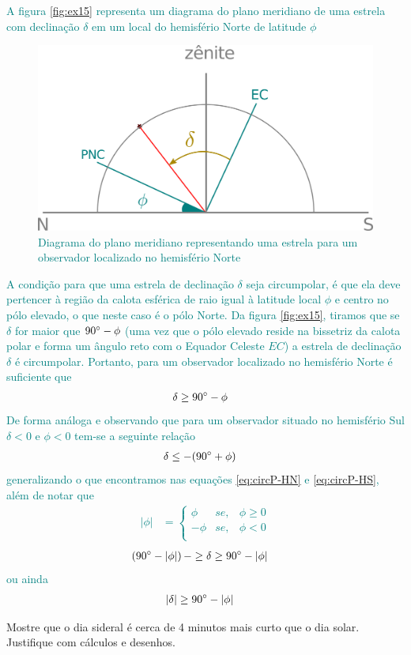 \begin{sol}
	\textcolor{teal} {
		A figura \eqref{fig:ex15} representa um diagrama do plano meridiano de uma estrela com declinação $\delta$ em um local do hemisfério Norte de latitude $\phi$ 
		\begin{figure}[!ht]			
			\centering
			\includegraphics[width=0.5\linewidth]{fig/fig-q15.png}			
			\caption{Diagrama do plano meridiano representando uma estrela para um observador localizado no hemisfério Norte}
			\label{fig:ex15}
		\end{figure}
	}
	
	\textcolor{teal} {
		A condição para que uma estrela de declinação $\delta$ seja circumpolar, é que ela deve pertencer à região da calota esférica de raio igual à latitude local $\phi$ e centro no pólo elevado, o que neste caso é o pólo Norte. Da figura \eqref{fig:ex15}, tiramos que se $\delta$ for maior que $90^{\circ}-\phi$ (uma vez que o pólo elevado reside na bissetriz da calota polar e forma um ângulo reto com o Equador Celeste $EC$) a estrela de declinação $\delta$ é circumpolar. Portanto, para um observador localizado no hemisfério Norte é suficiente que
		\begin{align}
			\delta&\geq 90^{\circ}-\phi
			\label{eq:circP-HN}
		\end{align}
		De forma análoga e observando que para um observador situado no hemisfério Sul $\delta<0$ e $\phi<0$ tem-se a seguinte relação
		\begin{align}
			\delta&\leq -(90^{\circ}+\phi)
			\label{eq:circP-HS}
		\end{align}
		generalizando o que encontramos nas equações \eqref{eq:circP-HN} e \eqref{eq:circP-HS}, além de notar que
		\begin{align}
			\left|\phi \right|&=\left\{\begin{matrix}
				\phi & se, & \phi\geq0  \\
				-\phi & se,& \phi<0  \\
				\end{matrix}\right.
		\end{align}
		\begin{align}
			\left(90^{\circ}-|\phi|\right)-&\geq\delta\geq90^{\circ}-|\phi| 
		\end{align}
		ou ainda
		\begin{align}
			|\delta|&\geq90^{\circ}-|\phi|
		\end{align}
	}			
\end{sol}
\begin{prob}[ref: P17]
	Mostre que o dia sideral é cerca de 4 minutos mais curto que o dia solar. Justifique com cálculos
	e desenhos.
\end{prob}

